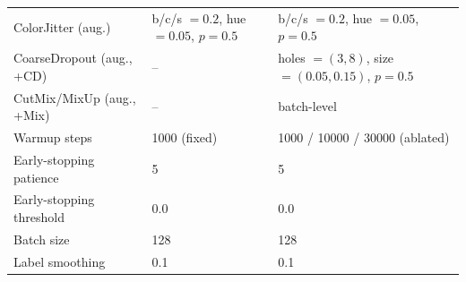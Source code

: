 {\begin{minipage}{\textwidth}
\begin{center}
\begin{tabular}{@{}lll@{}}
        ColorJitter (aug.)           & b/c/s $=0.2$, hue $=0.05$, $p=0.5$ & b/c/s $=0.2$, hue $=0.05$, $p=0.5$           \\
        CoarseDropout (aug., +CD)    & --                                 & holes $=(3,8)$, size $=(0.05,0.15)$, $p=0.5$ \\
        CutMix/MixUp (aug., +Mix)    & --                                 & batch-level                                  \\
        Warmup steps                 & 1000 (fixed)                       & 1000 / 10000 / 30000 (ablated)               \\
        Early-stopping patience      & 5                                  & 5                                            \\
        Early-stopping threshold     & 0.0                                & 0.0                                          \\
        Batch size                   & 128                                & 128                                          \\
        Label smoothing              & 0.1                                & 0.1                                          \\
        \bottomrule
      \end{tabular}
    \end{center}
  \end{minipage}%
}
\par

